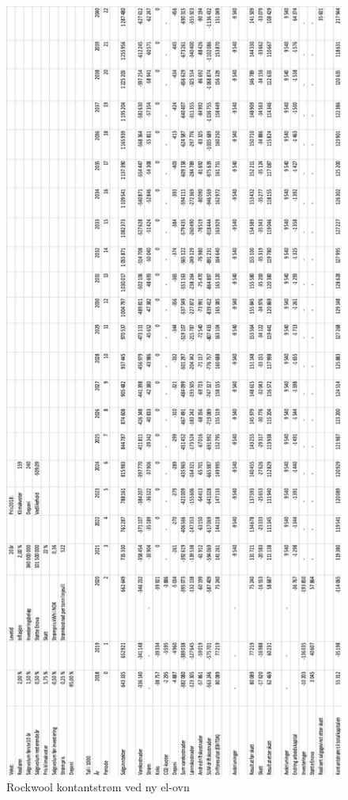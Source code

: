 \begin{figure}[H]
\centering
\includegraphics [scale=0.6]{appendiks/bilder/NNVelOvn.png}
\caption{Rockwool kontantstrøm ved ny el-ovn}
\label{fig:NNVelOvn}
\end{figure}

